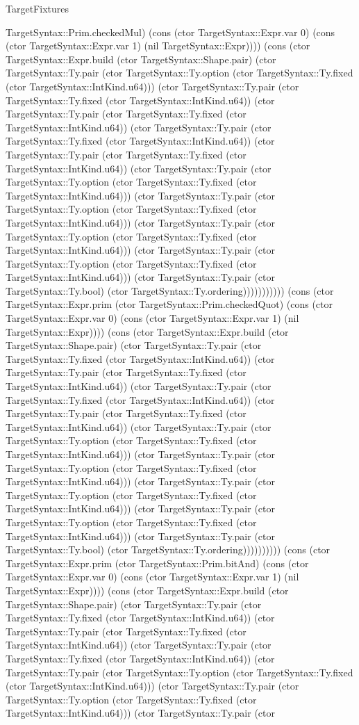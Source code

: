 \begin{lexlean}{TargetFixtures}
\begin{semanticmodule}
{TargetSyntax::Prim.checkedMul) (cons (ctor TargetSyntax::Expr.var 0) (cons (ctor TargetSyntax::Expr.var 1) (nil TargetSyntax::Expr)))) (cons (ctor TargetSyntax::Expr.build (ctor TargetSyntax::Shape.pair) (ctor TargetSyntax::Ty.pair (ctor TargetSyntax::Ty.option (ctor TargetSyntax::Ty.fixed (ctor TargetSyntax::IntKind.u64))) (ctor TargetSyntax::Ty.pair (ctor TargetSyntax::Ty.fixed (ctor TargetSyntax::IntKind.u64)) (ctor TargetSyntax::Ty.pair (ctor TargetSyntax::Ty.fixed (ctor TargetSyntax::IntKind.u64)) (ctor TargetSyntax::Ty.pair (ctor TargetSyntax::Ty.fixed (ctor TargetSyntax::IntKind.u64)) (ctor TargetSyntax::Ty.pair (ctor TargetSyntax::Ty.fixed (ctor TargetSyntax::IntKind.u64)) (ctor TargetSyntax::Ty.pair (ctor TargetSyntax::Ty.option (ctor TargetSyntax::Ty.fixed (ctor TargetSyntax::IntKind.u64))) (ctor TargetSyntax::Ty.pair (ctor TargetSyntax::Ty.option (ctor TargetSyntax::Ty.fixed (ctor TargetSyntax::IntKind.u64))) (ctor TargetSyntax::Ty.pair (ctor TargetSyntax::Ty.option (ctor TargetSyntax::Ty.fixed (ctor TargetSyntax::IntKind.u64))) (ctor TargetSyntax::Ty.pair (ctor TargetSyntax::Ty.option (ctor TargetSyntax::Ty.fixed (ctor TargetSyntax::IntKind.u64))) (ctor TargetSyntax::Ty.pair (ctor TargetSyntax::Ty.bool) (ctor TargetSyntax::Ty.ordering))))))))))) (cons (ctor TargetSyntax::Expr.prim (ctor TargetSyntax::Prim.checkedQuot) (cons (ctor TargetSyntax::Expr.var 0) (cons (ctor TargetSyntax::Expr.var 1) (nil TargetSyntax::Expr)))) (cons (ctor TargetSyntax::Expr.build (ctor TargetSyntax::Shape.pair) (ctor TargetSyntax::Ty.pair (ctor TargetSyntax::Ty.fixed (ctor TargetSyntax::IntKind.u64)) (ctor TargetSyntax::Ty.pair (ctor TargetSyntax::Ty.fixed (ctor TargetSyntax::IntKind.u64)) (ctor TargetSyntax::Ty.pair (ctor TargetSyntax::Ty.fixed (ctor TargetSyntax::IntKind.u64)) (ctor TargetSyntax::Ty.pair (ctor TargetSyntax::Ty.fixed (ctor TargetSyntax::IntKind.u64)) (ctor TargetSyntax::Ty.pair (ctor TargetSyntax::Ty.option (ctor TargetSyntax::Ty.fixed (ctor TargetSyntax::IntKind.u64))) (ctor TargetSyntax::Ty.pair (ctor TargetSyntax::Ty.option (ctor TargetSyntax::Ty.fixed (ctor TargetSyntax::IntKind.u64))) (ctor TargetSyntax::Ty.pair (ctor TargetSyntax::Ty.option (ctor TargetSyntax::Ty.fixed (ctor TargetSyntax::IntKind.u64))) (ctor TargetSyntax::Ty.pair (ctor TargetSyntax::Ty.option (ctor TargetSyntax::Ty.fixed (ctor TargetSyntax::IntKind.u64))) (ctor TargetSyntax::Ty.pair (ctor TargetSyntax::Ty.bool) (ctor TargetSyntax::Ty.ordering)))))))))) (cons (ctor TargetSyntax::Expr.prim (ctor TargetSyntax::Prim.bitAnd) (cons (ctor TargetSyntax::Expr.var 0) (cons (ctor TargetSyntax::Expr.var 1) (nil TargetSyntax::Expr)))) (cons (ctor TargetSyntax::Expr.build (ctor TargetSyntax::Shape.pair) (ctor TargetSyntax::Ty.pair (ctor TargetSyntax::Ty.fixed (ctor TargetSyntax::IntKind.u64)) (ctor TargetSyntax::Ty.pair (ctor TargetSyntax::Ty.fixed (ctor TargetSyntax::IntKind.u64)) (ctor TargetSyntax::Ty.pair (ctor TargetSyntax::Ty.fixed (ctor TargetSyntax::IntKind.u64)) (ctor TargetSyntax::Ty.pair (ctor TargetSyntax::Ty.option (ctor TargetSyntax::Ty.fixed (ctor TargetSyntax::IntKind.u64))) (ctor TargetSyntax::Ty.pair (ctor TargetSyntax::Ty.option (ctor TargetSyntax::Ty.fixed (ctor TargetSyntax::IntKind.u64))) (ctor TargetSyntax::Ty.pair (ctor }
\end{semanticmodule}
\end{lexlean}
